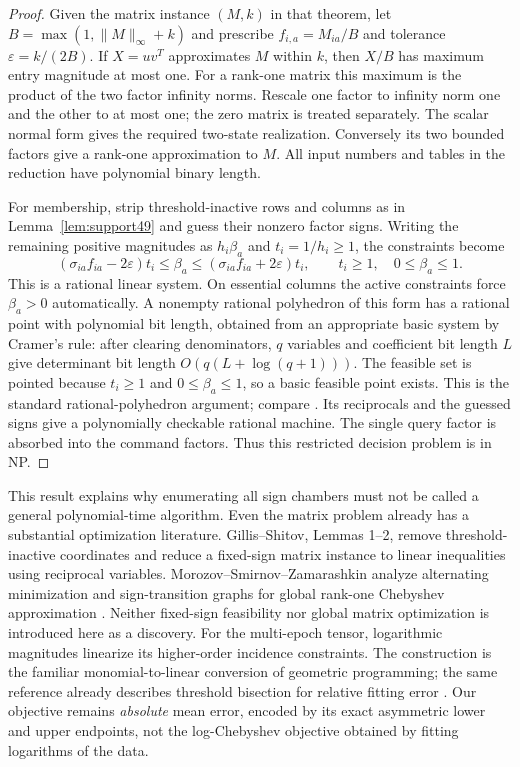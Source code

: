 \begin{proof}
Given the matrix instance $(M,k)$ in that theorem, let
$B=\max(1,\|M\|_\infty+k)$ and prescribe $f_{i,a}=M_{ia}/B$
and tolerance $\varepsilon=k/(2B)$. If $X=uv^T$ approximates $M$
within $k$, then $X/B$ has maximum entry magnitude at most one.
For a rank-one matrix this maximum is the product of the two factor
infinity norms. Rescale one factor to infinity norm one and the
other to at most one; the zero matrix is treated separately.
The scalar normal form gives the required two-state realization.
Conversely its two bounded factors give a rank-one approximation to
$M$. All input numbers and tables in the reduction have polynomial
binary length.

For membership, strip threshold-inactive rows and columns as in
Lemma~\ref{lem:support49} and guess their nonzero factor signs.
Writing the remaining positive magnitudes as $h_i\beta_a$ and
$t_i=1/h_i\ge1$, the constraints become
\[
 (\sigma_{ia}f_{ia}-2\varepsilon)t_i\le\beta_a
 \le(\sigma_{ia}f_{ia}+2\varepsilon)t_i,
 \qquad t_i\ge1,\quad0\le\beta_a\le1.
\]
This is a rational linear system. On essential columns the active
constraints force $\beta_a>0$ automatically. A nonempty rational
polyhedron of this form has a rational point with polynomial bit
length, obtained from an appropriate basic system by Cramer's rule: after clearing denominators, $q$ variables and coefficient bit length $L$ give determinant bit length $O(q(L+\log(q+1)))$. The feasible set is pointed because $t_i\ge1$ and $0\le\beta_a\le1$, so a basic feasible point exists. This is the standard rational-polyhedron argument; compare \cite[Chapter 10]{Sch86}. Its reciprocals
and the guessed signs give a polynomially checkable rational machine.
The single query factor is absorbed into the command factors.
Thus this restricted decision problem is in NP.
\end{proof}

This result explains why enumerating all sign chambers must not be
called a general polynomial-time algorithm. Even the matrix problem
already has a substantial optimization literature. Gillis--Shitov,
Lemmas 1--2, remove threshold-inactive coordinates and reduce a
fixed-sign matrix instance to linear inequalities using reciprocal
variables. Morozov--Smirnov--Zamarashkin analyze alternating
minimization and sign-transition graphs for global rank-one Chebyshev
approximation \cite[Theorem 5.3]{MSZ23}. Neither fixed-sign feasibility
nor global matrix optimization is introduced here as a discovery.
For the multi-epoch tensor, logarithmic magnitudes linearize its
higher-order incidence constraints. The construction is the familiar
monomial-to-linear conversion of geometric programming; the same
reference already describes threshold bisection for relative fitting
error \cite[\S2 and \S8]{BKVH07}. Our objective remains \emph{absolute}
mean error, encoded by its exact asymmetric lower and upper endpoints,
not the log-Chebyshev objective obtained by fitting logarithms of the
data.

